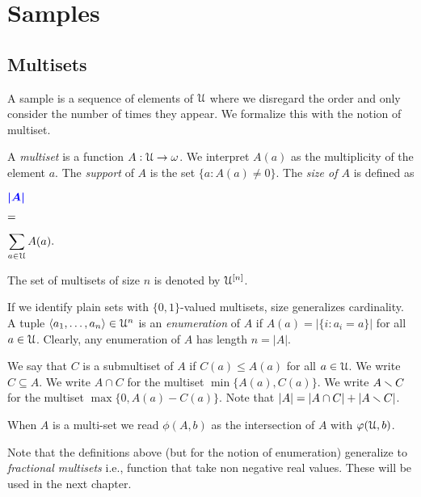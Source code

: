 \documentclass[sputnik.tex]{subfiles}
\begin{document}
\def\Fr{\mathop{\rm Fr}}

\def\vc{{\footnotesize VC}}
\def\nip{{\footnotesize NIP}}


\def\medrel#1{\parbox[t]{6ex}{$\displaystyle\hfil #1$}}
\def\ceq#1#2#3{\parbox[t]{25ex}{$\displaystyle #1$}\medrel{#2}{$\displaystyle #3$}}



\chapter{Samples}


\section{Multisets}\label{multisets}

A sample is a sequence of elements of $\EuScript U$ where we disregard the order and only consider the number of times they appear.
We formalize this with the notion of multiset. 

A \emph{multiset\/} is a function $A:\EuScript U\to\omega$.
We interpret $A(a)$ as the multiplicity of the element $a$.
The \emph{support\/} of $A$ is the set $\{a:A(a)\neq0\}$.
The \emph{size of $A$\/} is defined as

\ceq{\hfill\emph{$|A|$}}{=}{\sum_{a\in\U} A(a).}

The set of multisets of size $n$ is denoted by \emph{$\EuScript U^{[n]}$}.

If we identify plain sets with $\{0,1\}$-valued multisets, size generalizes cardinality.
A tuple $\langle a_1,\dots,a_n\rangle\in\EuScript U^n$ is an \emph{enumeration\/} of $A$ if $A(a)=\big|\{i:a_i=a\}\big|$ for all $a\in\EuScript U$.
Clearly, any enumeration of $A$ has length $n=|A|$.

We say that $C$ is a submultiset of $A$ if $C(a)\le A(a)$ for all $a\in\EuScript U$.
We write \emph{$C\subseteq A$}.
We write \emph{$A\cap C$\/} for the multiset $\min\{A(a),C(a)\}$.
We write \emph{$A\smallsetminus C$\/} for the multiset $\max\{0,A(a)-C(a)\}$.
Note that $|A|=|A\cap C|+|A\smallsetminus C|$.

When $A$ is a multi-set we read \emph{$\phi(A,b)$\/} as the intersection of $A$ with $\varphi(\EuScript U,b)$.

Note that the definitions above (but for the notion of enumeration) generalize to \emph{fractional multisets\/} i.e.,  function that take non negative real values.
These will be used in the next chapter.
\end{document}

